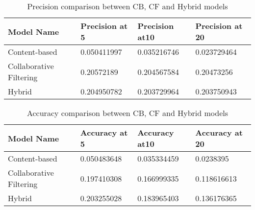 \vspace{-1em}

\begin{table}[H]
\centering
\begin{tabular}{|l|l|l|l|}
\hline
\rowcolor[HTML]{C0C0C0} 
{\color[HTML]{000000} \textbf{Model Name}}     & {\color[HTML]{000000} \textbf{Precision at 5}} & {\color[HTML]{000000} \textbf{Precision at10}} & {\color[HTML]{000000} \textbf{Precision at 20}} \\ \hline
{\color[HTML]{000000} Content-based}           & {\color[HTML]{000000} 0.050411997}             & {\color[HTML]{000000} 0.035216746}             & {\color[HTML]{000000} 0.023729464}              \\ \hline
{\color[HTML]{000000} Collaborative Filtering} & {\color[HTML]{000000} 0.20572189}              & {\color[HTML]{000000} 0.204567584}             & {\color[HTML]{000000} 0.20473256}               \\ \hline
{\color[HTML]{000000} Hybrid}                  & {\color[HTML]{000000} 0.204950782}             & {\color[HTML]{000000} 0.203729964}             & {\color[HTML]{000000} 0.203750943}              \\ \hline
\end{tabular}
\caption{Precision comparison between CB, CF and Hybrid models}
\label{tb:precision}
\end{table}

\vspace{-1em}

\begin{table}[H]
\centering
\begin{tabular}{|l|l|l|l|}
\hline
\rowcolor[HTML]{C0C0C0} 
{\color[HTML]{000000} \textbf{Model Name}}     & {\color[HTML]{000000} \textbf{Accuracy at 5}} & {\color[HTML]{000000} \textbf{Accuracy at10}} & {\color[HTML]{000000} \textbf{Accuracy at 20}} \\ \hline
{\color[HTML]{000000} Content-based}           & {\color[HTML]{000000} 0.050483648}            & {\color[HTML]{000000} 0.035334459}            & {\color[HTML]{000000} 0.0238395}               \\ \hline
{\color[HTML]{000000} Collaborative Filtering} & {\color[HTML]{000000} 0.197410308}            & {\color[HTML]{000000} 0.166999335}            & {\color[HTML]{000000} 0.118616613}             \\ \hline
{\color[HTML]{000000} Hybrid}                  & {\color[HTML]{000000} 0.203255028}            & {\color[HTML]{000000} 0.183965403}            & {\color[HTML]{000000} 0.136176365}             \\ \hline
\end{tabular}
\caption{Accuracy comparison between CB, CF and Hybrid models}
\label{tb:accuracy}
\end{table}

